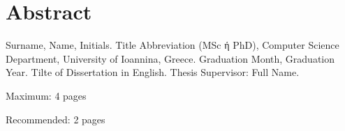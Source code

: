 \chapter*{Abstract}

Surname, Name, Initials. Title Abbreviation (MSc ή PhD), Computer
Science Department, University of Ioannina, Greece. Graduation
Month, Graduation Year. Tilte of Dissertation in English.  Thesis
Supervisor:  Full Name.




\y\noindent Maximum: 4 pages

\y\noindent Recommended: 2 pages
